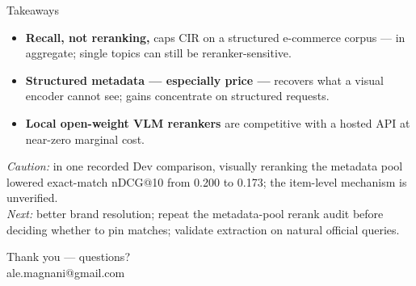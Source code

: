 \documentclass[aspectratio=169,10pt]{beamer}
\begin{document}
\begin{frame}{Takeaways}
\begin{itemize}
  \item \textbf{Recall, not reranking,} caps CIR on a structured e-commerce corpus --- in aggregate; single topics can still be reranker-sensitive.
  \item \textbf{Structured metadata --- especially price ---} recovers what a
        visual encoder cannot see; gains concentrate on structured requests.
  \item \textbf{Local open-weight VLM rerankers} are competitive with a hosted
        API at near-zero marginal cost.
\end{itemize}
\medskip
\footnotesize\textit{Caution:} in one recorded Dev comparison, visually reranking the
metadata pool lowered exact-match nDCG@10 from 0.200 to 0.173; the item-level
mechanism is unverified.\\
\textit{Next:} better brand resolution; repeat the metadata-pool rerank audit before
deciding whether to pin matches; validate extraction on natural official queries.
\vfill
\begin{center}\large\color{accent}
Thank you --- questions?\\[2pt]
\normalsize ale.magnani@gmail.com
\end{center}
\end{frame}
\end{document}
